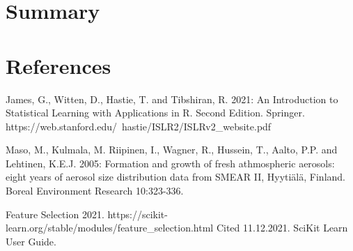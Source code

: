 \documentclass[a4size, 12pt]{report}
\begin{document}
	  
	
\section*{Summary}
	

	     

\section*{References}

James, G., Witten, D., Hastie, T. and Tibshiran, R. 2021: An Introduction to Statistical Learning with Applications in R. Second Edition. Springer. https://web.stanford.edu/~hastie/ISLR2/ISLRv2\_website.pdf  

Maso, M., Kulmala, M. Riipinen, I., Wagner, R., Hussein, T., Aalto, P.P. and Lehtinen, K.E.J. 2005: Formation and growth of fresh athmospheric aerosols: eight years of aerosol size distribution data from SMEAR II, Hyytiälä, Finland. Boreal Environment Research 10:323-336. 

Feature Selection 2021. https://scikit-learn.org/stable/modules/feature\_selection.html  Cited 11.12.2021. SciKit Learn User Guide. 
\end{document}
